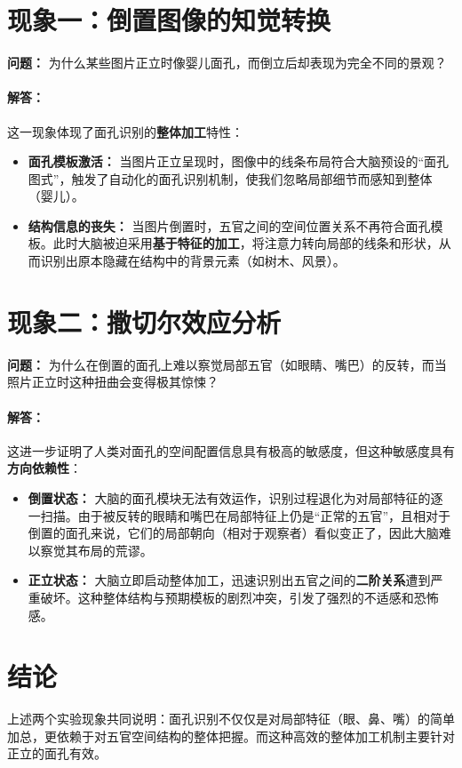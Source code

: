 \documentclass[11pt]{article}
\begin{document}
\section{现象一：倒置图像的知觉转换}
\textbf{问题：} 为什么某些图片正立时像婴儿面孔，而倒立后却表现为完全不同的景观？

\paragraph{解答：}
这一现象体现了面孔识别的\textbf{整体加工}特性：
\begin{itemize}
    \item \textbf{面孔模板激活：} 当图片正立呈现时，图像中的线条布局符合大脑预设的“面孔图式”，触发了自动化的面孔识别机制，使我们忽略局部细节而感知到整体（婴儿）。
    \item \textbf{结构信息的丧失：} 当图片倒置时，五官之间的空间位置关系不再符合面孔模板。此时大脑被迫采用\textbf{基于特征的加工}，将注意力转向局部的线条和形状，从而识别出原本隐藏在结构中的背景元素（如树木、风景）。
\end{itemize}

\section{现象二：撒切尔效应分析}
\textbf{问题：} 为什么在倒置的面孔上难以察觉局部五官（如眼睛、嘴巴）的反转，而当照片正立时这种扭曲会变得极其惊悚？

\paragraph{解答：}
这进一步证明了人类对面孔的空间配置信息具有极高的敏感度，但这种敏感度具有\textbf{方向依赖性}：
\begin{itemize}
    \item \textbf{倒置状态：} 大脑的面孔模块无法有效运作，识别过程退化为对局部特征的逐一扫描。由于被反转的眼睛和嘴巴在局部特征上仍是“正常的五官”，且相对于倒置的面孔来说，它们的局部朝向（相对于观察者）看似变正了，因此大脑难以察觉其布局的荒谬。
    \item \textbf{正立状态：} 大脑立即启动整体加工，迅速识别出五官之间的\textbf{二阶关系}遭到严重破坏。这种整体结构与预期模板的剧烈冲突，引发了强烈的不适感和恐怖感。
\end{itemize}

\section{结论}
上述两个实验现象共同说明：面孔识别不仅仅是对局部特征（眼、鼻、嘴）的简单加总，更依赖于对五官空间结构的整体把握。而这种高效的整体加工机制主要针对正立的面孔有效。
\end{document}
